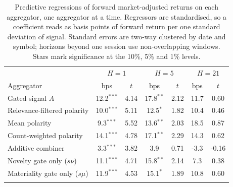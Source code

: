 \begin{table}[htbp]
\caption{Predictive regressions of forward market-adjusted returns on each
aggregator, one aggregator at a time. Regressors are standardised, so a
coefficient reads as basis points of forward return per one standard deviation of
signal. Standard errors are two-way clustered by date and symbol; horizons beyond
one session use non-overlapping windows. Stars mark significance at the 10\%,
5\% and 1\% levels.}
\label{tab:univariate}
\begin{tabular}{@{}lcccccc@{}}
\toprule
 & \multicolumn{2}{c}{$H=1$} & \multicolumn{2}{c}{$H=5$} & \multicolumn{2}{c}{$H=21$} \\
Aggregator & bps & $t$ & bps & $t$ & bps & $t$ \\
\midrule
Gated signal $A$ & 12.2$^{***}$ & 4.14 & 17.8$^{**}$ & 2.12 & 11.7 & 0.60 \\
Relevance-filtered polarity & 10.0$^{***}$ & 5.11 & 12.5$^{*}$ & 1.82 & 10.4 & 0.46 \\
Mean polarity & 9.3$^{***}$ & 5.52 & 13.6$^{**}$ & 2.03 & 18.5 & 0.87 \\
Count-weighted polarity & 14.1$^{***}$ & 4.78 & 17.1$^{**}$ & 2.29 & 14.3 & 0.62 \\
Additive combiner & 3.3$^{***}$ & 3.82 & 3.9 & 0.71 & -3.3 & -0.16 \\
Novelty gate only ($s\nu$) & 11.1$^{***}$ & 4.71 & 15.8$^{**}$ & 2.14 & 7.3 & 0.38 \\
Materiality gate only ($s\mu$) & 11.9$^{***}$ & 4.53 & 15.1$^{*}$ & 1.89 & 10.8 & 0.60 \\
\botrule
\end{tabular}
\end{table}
